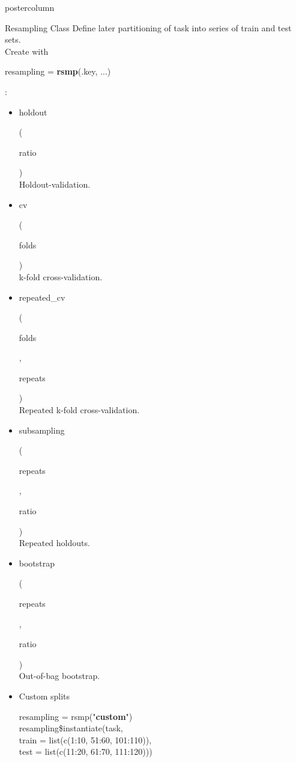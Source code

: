 \documentclass{beamer}
\newlength{\columnheight} %
\newcommand{\codeinline}[1]{\begin{codeboxinline}#1\end{codeboxinline}}
\begin{document}
\begin{withoutheader}
\begin{frame}[fragile]{}
	\begin{columns}
		\begin{column}{.245\textwidth}
			\begin{beamercolorbox}[center]{postercolumn}
				\begin{minipage}{.98\textwidth}
					\parbox[t][\columnheight]{\textwidth}{
						\begin{myblock}{Resampling Class}
							Define later partitioning of task into series of train and test sets. \\ 
							Create with \codeinline{resampling = \textbf{rsmp}(.key, ...)}:
							\begin{itemize}
                                \item \codeinline{holdout}
                                (\codeinline{ratio})\\
                                Holdout-validation.
								\item \codeinline{cv}
								(\codeinline{folds})\\
								k-fold cross-validation.
								\item \codeinline{repeated\_cv}
								(\codeinline{folds}, \codeinline{repeats})\\
								Repeated k-fold cross-validation.
								\item \codeinline{subsampling}
								(\codeinline{repeats}, \codeinline{ratio})\\
								Repeated holdouts.
								\item \codeinline{bootstrap}
								(\codeinline{repeats}, \codeinline{ratio})\\
								Out-of-bag bootstrap.
								\item Custom splits \\
							\begin{codeboxmultiline}[width=26cm]
							resampling = rsmp("\textbf{custom}")\\
							resampling\$instantiate(task,\\
							\hspace*{1ex} train = list(c(1:10, 51:60, 101:110)),\\
							\hspace*{1ex} test = list(c(11:20, 61:70, 111:120)))
							\end{codeboxmultiline}
							\end{itemize}
							\vspace{1em}

\end{myblock}}
\end{minipage}
\end{beamercolorbox}
\end{column}
\end{columns}
\end{frame}
\end{withoutheader}
\end{document}
